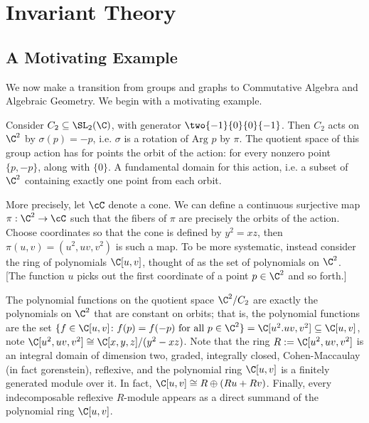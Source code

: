 \newpage
\section{Invariant Theory}
\subsection{A Motivating Example}
We now make a transition from groups and graphs to Commutative Algebra and Algebraic Geometry. We begin with a motivating example. 


\begin{ex} \label{ex:mot}
Consider $C_2 \subseteq \SL_2(\C)$, with generator $\two{-1}{0}{0}{-1}$. Then $C_2$ acts on $\C^2$ by $\sigma(p)= -p$, i.e. $\sigma$ is a rotation of $\text{Arg }p$ by $\pi$. The quotient space of this group action has for points the orbit of the action: for every nonzero point $\{p,-p\}$, along with $\{0\}$. A fundamental domain for this action, i.e. a subset of $\C^2$ containing exactly one point from each orbit. 


More precisely, let $\cC$ denote a cone. We can define a continuous surjective map $\pi: \C^2 \to \cC$ such that the fibers of $\pi$ are precisely the orbits of the action. Choose coordinates so that the cone is defined by $y^2=xz$, then $\pi(u,v)= (u^2,uv,v^2)$ is such a map. To be more systematic, instead consider the ring of polynomials $\C[u,v]$, thought of as the set of polynomials on $\C^2$. [The function $u$ picks out the first coordinate of a point $p \in \C^2$ and so forth.] 

The polynomial functions on the quotient space $\C^2/C_2$ are exactly the polynomials on $\C^2$ that are constant on orbits; that is, the polynomial functions are the set $\{f \in \C[u,v] \colon f(p)=f(-p) \text{ for all } p \in \C^2\}=\C[u^2.uv,v^2] \subseteq \C[u,v]$, note $\C[u^2,uv,v^2] \cong \C[x,y,z]/(y^2-xz)$. Note that the ring $R:= \C[u^2,uv,v^2]$ is an integral domain of dimension two, graded, integrally closed, Cohen-Maccaulay (in fact gorenstein), reflexive, and the polynomial ring $\C[u,v]$ is a finitely generated module over it. In fact, $\C[u,v] \cong R \oplus (Ru + Rv)$. Finally, every indecomposable reflexive $R$-module appears as a direct summand of the polynomial ring $\C[u,v]$. \xqed
\end{ex}

